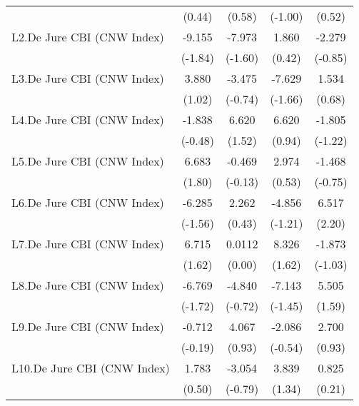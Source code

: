 {\begin{longtable}{l*{4}{c}}
                &   (0.44)         &   (0.58)         &  (-1.00)         &   (0.52)         \\
[1em]
L2.De Jure CBI (CNW Index)&   -9.155         &   -7.973         &    1.860         &   -2.279         \\
                &  (-1.84)         &  (-1.60)         &   (0.42)         &  (-0.85)         \\
[1em]
L3.De Jure CBI (CNW Index)&    3.880         &   -3.475         &   -7.629         &    1.534         \\
                &   (1.02)         &  (-0.74)         &  (-1.66)         &   (0.68)         \\
[1em]
L4.De Jure CBI (CNW Index)&   -1.838         &    6.620         &    6.620         &   -1.805         \\
                &  (-0.48)         &   (1.52)         &   (0.94)         &  (-1.22)         \\
[1em]
L5.De Jure CBI (CNW Index)&    6.683         &   -0.469         &    2.974         &   -1.468         \\
                &   (1.80)         &  (-0.13)         &   (0.53)         &  (-0.75)         \\
[1em]
L6.De Jure CBI (CNW Index)&   -6.285         &    2.262         &   -4.856         &    6.517\sym{*}  \\
                &  (-1.56)         &   (0.43)         &  (-1.21)         &   (2.20)         \\
[1em]
L7.De Jure CBI (CNW Index)&    6.715         &   0.0112         &    8.326         &   -1.873         \\
                &   (1.62)         &   (0.00)         &   (1.62)         &  (-1.03)         \\
[1em]
L8.De Jure CBI (CNW Index)&   -6.769         &   -4.840         &   -7.143         &    5.505         \\
                &  (-1.72)         &  (-0.72)         &  (-1.45)         &   (1.59)         \\
[1em]
L9.De Jure CBI (CNW Index)&   -0.712         &    4.067         &   -2.086         &    2.700         \\
                &  (-0.19)         &   (0.93)         &  (-0.54)         &   (0.93)         \\
[1em]
L10.De Jure CBI (CNW Index)&    1.783         &   -3.054         &    3.839         &    0.825         \\
                &   (0.50)         &  (-0.79)         &   (1.34)         &   (0.21)         \\

\end{longtable}}
